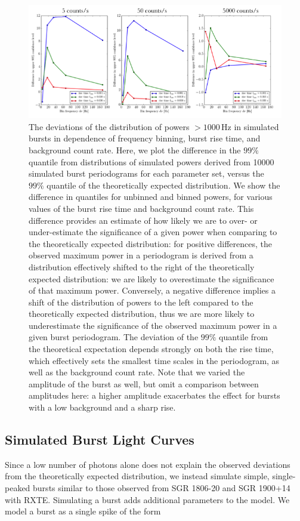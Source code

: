 \documentclass[numberedappendix]{emulateapj}
\newcommand{\hz}{\,\mathrm{Hz}}
\begin{document}
\begin{figure}[htbp]
\begin{center}
\includegraphics[width=18cm]{weak_burst_sims.png}
\caption{The deviations of the distribution of powers $>1000 \hz$ in simulated bursts in dependence of frequency binning, burst rise time, and background count rate. Here, we plot the difference in the $99\%$ quantile from distributions of simulated powers derived from 10000 simulated burst periodograms for each parameter set, versus the $99\%$ quantile of the theoretically expected distribution. We show the difference in quantiles for unbinned and binned powers, for various values of the burst rise time and background count rate. This difference provides an estimate of how likely we are to over- or under-estimate the significance of a given power when comparing to the theoretically expected distribution: for positive differences, the observed maximum power in a periodogram is derived from a distribution effectively shifted to the right of the theoretically expected distribution: we are likely to overestimate the significance of that maximum power. Conversely, a negative difference implies a shift of the distribution of powers to the left compared to the theoretically expected distribution, thus we are more likely to underestimate the significance of the observed maximum power in a given burst periodogram. The deviation of the $99\%$ quantile from the theoretical expectation depends strongly on both the rise time, which effectively sets the smallest time scales in the periodogram, as well as the background count rate. Note that we varied the amplitude of the burst as well, but omit a comparison between amplitudes here: a higher amplitude exacerbates the effect for bursts with a low background and a sharp rise.}
\label{fig:weak_bursts}
\end{center}
\end{figure}

\subsection{Simulated Burst Light Curves}
\label{sec:weakburstsims}
Since a low number of photons alone does not explain the observed deviations from the theoretically expected distribution, we instead simulate simple, single-peaked bursts similar to those observed from SGR 1806-20 and SGR 1900+14 with RXTE.
Simulating a burst adds additional parameters to the model. We model a burst as a single spike of the form
\end{document}
